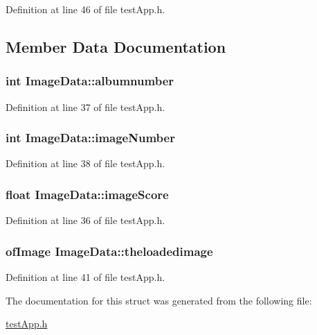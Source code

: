Definition at line 46 of file test\-App.\-h.



\subsection{Member Data Documentation}
\hypertarget{struct_image_data_a372655668350953b85fda1f07cd3ffe1}{
\subsubsection[{albumnumber}]{\setlength{\rightskip}{0pt plus 5cm}int Image\-Data\-::albumnumber}}\label{struct_image_data_a372655668350953b85fda1f07cd3ffe1}


Definition at line 37 of file test\-App.\-h.

\hypertarget{struct_image_data_a254eb9353be246c69591d51088683397}{
\subsubsection[{image\-Number}]{\setlength{\rightskip}{0pt plus 5cm}int Image\-Data\-::image\-Number}}\label{struct_image_data_a254eb9353be246c69591d51088683397}


Definition at line 38 of file test\-App.\-h.

\hypertarget{struct_image_data_a7161728d2f1bd4240bd9359f6276dd3b}{
\subsubsection[{image\-Score}]{\setlength{\rightskip}{0pt plus 5cm}float Image\-Data\-::image\-Score}}\label{struct_image_data_a7161728d2f1bd4240bd9359f6276dd3b}


Definition at line 36 of file test\-App.\-h.

\hypertarget{struct_image_data_acf1bde00dd79a0960269618d9b885f61}{
\subsubsection[{theloadedimage}]{\setlength{\rightskip}{0pt plus 5cm}of\-Image Image\-Data\-::theloadedimage}}\label{struct_image_data_acf1bde00dd79a0960269618d9b885f61}


Definition at line 41 of file test\-App.\-h.



The documentation for this struct was generated from the following file\-:\begin{DoxyCompactItemize}
\item 
\hyperlink{test_app_8h}{test\-App.\-h}\end{DoxyCompactItemize}
